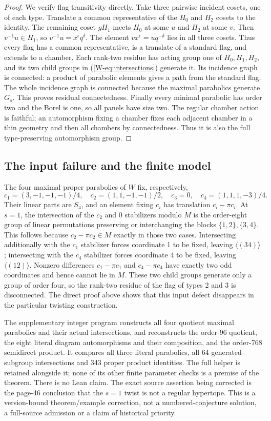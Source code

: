 \begin{proof}
We verify flag transitivity directly. Take three pairwise incident
cosets, one of each type. Translate a common representative of the
$H_0$ and $H_2$ cosets to the identity. The remaining coset $gH_1$
meets $H_0$ at some $u$ and $H_2$ at some $v$.
Then $v^{-1}u\in H_1$, so
$v^{-1}u=x^\epsilon q^\delta$. The element
$vx^\epsilon=uq^{-\delta}$ lies in all three cosets. Thus every
flag has a common representative, is a translate of a standard flag,
and extends to a chamber. Each rank-two residue has acting group one
of $H_0,H_1,H_2$, and its two child groups in
(\ref{W-eq:intersections}) generate it. Its incidence graph is connected:
a product of parabolic elements gives a path from the standard flag.
The whole incidence graph is connected because the maximal parabolics
generate $G_s$. This proves residual connectedness. Finally every
minimal parabolic has order two and the Borel is one, so all panels
have size two. The regular chamber action is faithful; an automorphism
fixing a chamber fixes each adjacent chamber in a thin geometry and
then all chambers by connectedness. Thus it is also the full
type-preserving automorphism group.
\end{proof}

\subsection{The input failure and the finite model}
The four maximal proper parabolics of $W$ fix, respectively,
\[
 c_1=(3,-1,-1,-1)/4,\quad c_2=(1,1,-1,-1)/2,
 \quad c_3=0,\quad c_4=(1,1,1,-3)/4.
\]
Their linear parts are $S_4$, and an element fixing $c_i$ has
translation $c_i-\pi c_i$. At $s=1$, the intersection of the
$c_2$ and $0$ stabilizers modulo $M$ is the order-eight group of
linear permutations preserving or interchanging the blocks
$\{1,2\},\{3,4\}$. This follows because $c_2-\pi c_2\in M$
exactly in those two cases. Intersecting additionally with the
$c_1$ stabilizer forces coordinate 1 to be fixed, leaving
$\langle(34)\rangle$; intersecting with the $c_4$ stabilizer
forces coordinate 4 to be fixed, leaving $\langle(12)\rangle$.
Nonzero differences $c_1-\pi c_1$ and $c_4-\pi c_4$ have exactly
two odd coordinates and hence cannot lie in $M$.
These two child groups generate only a group of order four, so the
rank-two residue of the flag of types 2 and 3 is disconnected.
The direct proof above shows that this input defect disappears in
the particular twisting construction.

The supplementary integer program constructs all four quotient maximal
parabolics and their actual intersections, and reconstructs the order-96 quotient,
the eight literal diagram automorphisms and their composition, and
the order-768 semidirect product. It compares all three literal
parabolics, all 64 generated-subgroup intersections and 343 proper
product identities. The full helper is retained alongside it; none
of its other finite parameter checks is a premise of the theorem.
There is no Lean claim. The exact source assertion being corrected
is the page-46 conclusion that the $s=1$ twist is not a regular
hypertope. This is a version-bound theorem/example correction, not a
numbered-conjecture solution, a full-source admission or a claim of
historical priority.
